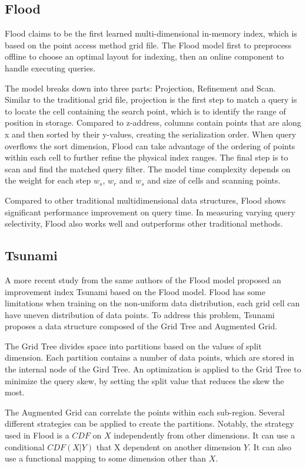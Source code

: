 \subsection{Flood}
Flood \cite{Nathan:2019wc} claims to be the first learned multi-dimensional in-memory index, which is based on the point access method grid file. The Flood model first to preprocess offline to choose an optimal layout for indexing, then an online component to handle executing queries. 

The model breaks down into three parts: Projection, Refinement and Scan. Similar to the traditional grid file, projection is the first step to match a query is to locate the cell containing the search point, which is to identify the range of position in storage. Compared to z-address, columns contain points that are along x and then sorted by their y-values, creating the serialization order. When query overflows the sort dimension, Flood can take advantage of the ordering of points within each cell to further refine the physical index ranges. The final step is to scan and find the matched query filter. The model time complexity depends on the weight for each step $w_s$, $w_r$ and $w_s$ and size of cells and scanning points. 

Compared to other traditional multidimensional data structures, Flood shows significant performance improvement on query time. In measuring varying query selectivity, Flood also works well and outperforms other traditional methods. 


\subsection{Tsunami}
A more recent study from the same authors of the Flood model proposed an improvement index Tsunami \cite{Ding:2020we} based on the Flood model. Flood has some limitations when training on the non-uniform data distribution, each grid cell can have uneven distribution of data points. To address this problem, Tsunami proposes a data structure composed of the Grid Tree and Augmented Grid. 

The Grid Tree divides space into partitions based on the values of split dimension. Each partition contains a number of data points, which are stored in the internal node of the Gird Tree. An optimization is applied to the Grid Tree to minimize the query skew, by setting the split value that reduces the skew the most. 

The Augmented Grid can correlate the points within each sub-region. Several different strategies can be applied to create the partitions. Notably, the strategy used in Flood is a $CDF$ on $X$ independently from other dimensions. It can use a conditional $CDF(X|Y)$ that X dependent on another dimension $Y$. It can also use a functional mapping to some dimension other than $X$. 

